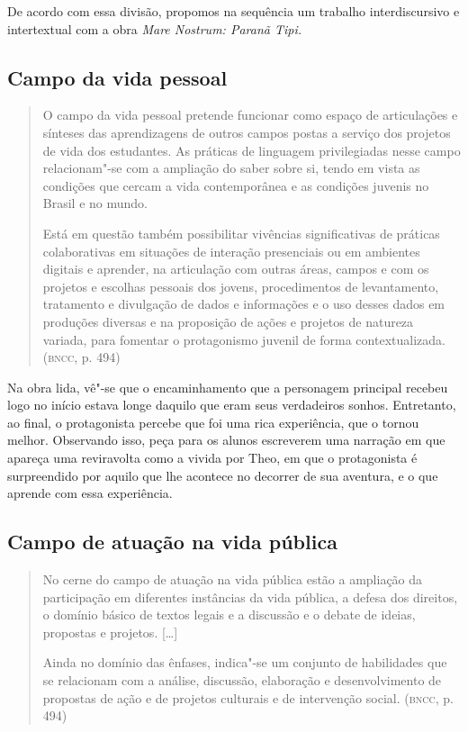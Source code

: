 \documentclass[12pt]{extarticle}
\begin{document}
De acordo com essa divisão, propomos na sequência um trabalho
interdiscursivo e intertextual com a obra \emph{Mare Nostrum: Paranã
Tipi.}

\subsection{Campo da vida pessoal}

\begin{quote}
O campo da vida pessoal pretende funcionar como espaço de articulações
e sínteses das aprendizagens de outros campos postas a serviço dos
projetos de vida dos estudantes. As práticas de linguagem privilegiadas
nesse campo relacionam"-se com a ampliação do saber sobre si, tendo em
vista as condições que cercam a vida contemporânea e as condições
juvenis no Brasil e no mundo.

Está em questão também possibilitar vivências significativas de práticas
colaborativas em situações de interação presenciais ou em ambientes
digitais e aprender, na articulação com outras áreas, campos e com os
projetos e escolhas pessoais dos jovens, procedimentos de levantamento,
tratamento e divulgação de dados e informações e o uso desses dados em
produções diversas e na proposição de ações e projetos de natureza
variada, para fomentar o protagonismo juvenil de forma
contextualizada. (\textsc{bncc}, p. 494)
\end{quote}

  Na obra lida, vê"-se que o encaminhamento que a personagem principal
  recebeu logo no início estava longe daquilo que eram seus verdadeiros
  sonhos. Entretanto, ao final, o protagonista percebe que foi uma rica
  experiência, que o tornou melhor. Observando isso, peça para os alunos
  escreverem uma narração em que apareça uma reviravolta como a vivida
  por Theo, em que o protagonista é surpreendido por aquilo que lhe
  acontece no decorrer de sua aventura, e o que aprende com essa
  experiência.

\subsection{Campo de atuação na vida pública}

\begin{quote}
No cerne do campo de atuação na vida pública estão a ampliação da
participação em diferentes instâncias da vida pública, a defesa dos
direitos, o domínio básico de textos legais e a discussão e o debate de
ideias, propostas e projetos. {[}\ldots{}{]}

Ainda no domínio das ênfases, indica"-se um conjunto de habilidades que
se relacionam com a análise, discussão, elaboração e desenvolvimento de
propostas de ação e de projetos culturais e de intervenção social.
(\textsc{bncc}, p. 494)
\end{quote}
\end{document}
